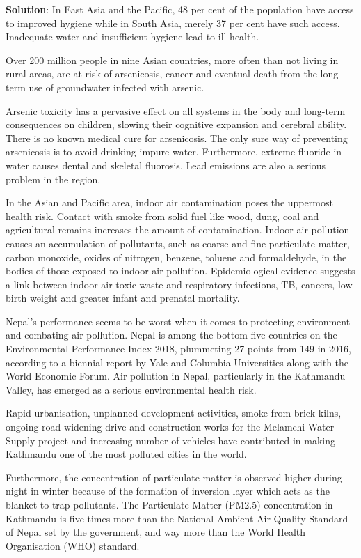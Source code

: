 \documentclass[
  openany]{book}
\newenvironment{solution}{ {\bfseries Solution}:}{}
\begin{document}
\begin{questions}
\begin{solution}
In East Asia and the Pacific, 48 per cent of the population have access to improved hygiene while in South Asia, merely 37 per cent have such access. Inadequate water and insufficient hygiene lead to ill health.

Over 200 million people in nine Asian countries, more often than not living in rural areas, are at risk of arsenicosis, cancer and eventual death from the long-term use of groundwater infected with arsenic.

Arsenic toxicity has a pervasive effect on all systems in the body and long-term consequences on children, slowing their cognitive expansion and cerebral ability. There is no known medical cure for arsenicosis. The only sure way of preventing arsenicosis is to avoid drinking impure water. Furthermore, extreme fluoride in water causes dental and skeletal fluorosis. Lead emissions are also a serious problem in the region.

In the Asian and Pacific area, indoor air contamination poses the uppermost health risk. Contact with smoke from solid fuel like wood, dung, coal and agricultural remains increases the amount of contamination. Indoor air pollution causes an accumulation of pollutants, such as coarse and fine particulate matter, carbon monoxide, oxides of nitrogen, benzene, toluene and formaldehyde, in the bodies of those exposed to indoor air pollution. Epidemiological evidence suggests a link between indoor air toxic waste and respiratory infections, TB, cancers, low birth weight and greater infant and prenatal mortality. 

Nepal's performance seems to be worst when it comes to protecting environment and combating air pollution. Nepal is among the bottom five countries on the Environmental Performance Index 2018, plummeting 27 points from 149 in 2016, according to a biennial report by Yale and Columbia Universities along with the World Economic Forum. Air pollution in Nepal, particularly in the Kathmandu Valley, has emerged as a serious environmental health risk.

Rapid urbanisation, unplanned development activities, smoke from brick kilns, ongoing road widening drive and construction works for the Melamchi Water Supply project and increasing number of vehicles have contributed in making Kathmandu one of the most polluted cities in the world.

Furthermore, the concentration of particulate matter is observed higher during night in winter because of the formation of inversion layer which acts as the blanket to trap pollutants. The Particulate Matter (PM2.5) concentration in Kathmandu is five times more than the National Ambient Air Quality Standard of Nepal set by the government, and way more than the World Health Organisation (WHO) standard.


\end{solution}
\end{questions}
\end{document}
